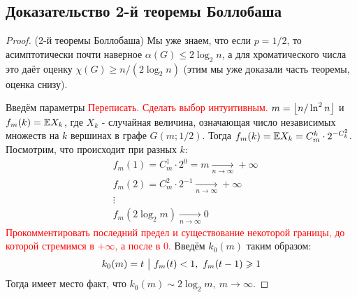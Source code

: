\subsection{Доказательство 2-й теоремы Боллобаша}

\begin{proof} (2-й теоремы Боллобаша)
	Мы уже знаем, что если $p = 1 / 2$, то асимптотически почти наверное $\alpha(G) \le 2\log_2 n$, а для хроматического числа это даёт оценку $\chi(G) \ge n / (2\log_2 n)$ (этим мы уже доказали часть теоремы, оценка снизу).
	
	Введём параметры \textcolor{red}{Переписать. Сделать выбор интуитивным.} $m = \left\lfloor n / \ln^2 n \right\rfloor$ и $f_m(k) = \mathbb{E} X_k$, где $X_k$ - случайная величина, означающая число независимых множеств на $k$ вершинах в графе $G(m; 1 / 2)$. Тогда $f_m(k) = \mathbb{E} X_k = C_m^k \cdot 2^{-C_k^2}$. Посмотрим, что происходит при разных $k$:
	\begin{align*}
		&{f_m(1) = C_m^1 \cdot 2^0 = m \xrightarrow[n \to \infty]{} +\infty}
		\\
		&{f_m(2) = C_m^2 \cdot 2^{-1} \xrightarrow[n \to \infty]{} +\infty}
		\\
		&{\vdots}
		\\
		&{f_m(2\log_2 m) \xrightarrow[n \to \infty]{} 0}
	\end{align*}
	\textcolor{red}{Прокомментировать последний предел и существование некоторой границы, до которой стремимся в $+\infty$, а после в 0.} Введём $k_0(m)$ таким образом:
	\[
		k_0(m) = t \ \big|\  f_m(t) < 1,\ f_m(t - 1) \geqslant 1
	\]
	Тогда имеет место факт, что $k_0(m) \sim 2\log_2 m,\ m \to \infty$.
\end{proof}
 